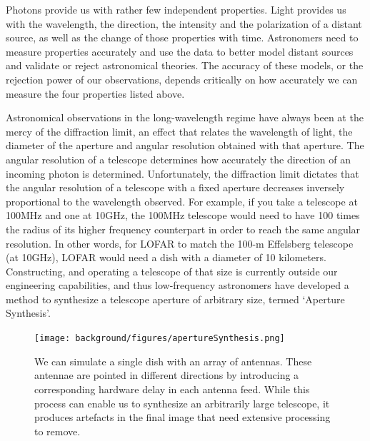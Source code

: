 Photons provide us with rather few independent properties. Light provides us with the wavelength, the direction, the intensity and the polarization of a distant source, as well as the change of those properties with time. Astronomers need to measure properties accurately and use the data to better model distant sources and validate or reject astronomical theories. The accuracy of these models, or the rejection power of our observations, depends critically on how accurately we can measure the four properties listed above. 

Astronomical observations in the long-wavelength regime have always been at the mercy of the diffraction limit, an effect that relates the wavelength of light, the diameter of the aperture and angular resolution obtained with that aperture. The angular resolution of a telescope determines how accurately the direction of an incoming photon is determined. Unfortunately, the diffraction limit dictates that the angular resolution of a telescope with a fixed aperture decreases inversely proportional to the wavelength observed. For example, if you take a telescope at 100MHz and one at 10GHz, the 100MHz telescope would need to have 100 times the radius of its higher frequency counterpart in order to reach the same angular resolution. In other words, for LOFAR to match the 100-m Effelsberg telescope (at 10GHz), LOFAR would need a dish with a diameter of 10 kilometers. Constructing, and operating a telescope of that size is currently outside our engineering capabilities, and thus low-frequency astronomers have developed a method to synthesize a telescope aperture of arbitrary size, termed `Aperture Synthesis'. 

\begin{figure}[h]
    \centering
    \texttt{[image: background/figures/apertureSynthesis.png]}
    \caption[Graphical representation of aperture synthesis]{We can simulate a single dish with an array of antennas. These antennae are pointed in different directions by introducing a corresponding hardware delay in each antenna feed. While this process can enable us to synthesize an arbitrarily large telescope, it produces artefacts in the final image that need extensive processing to remove. }
    \label{fig:aperture_synthesis}
\end{figure}


